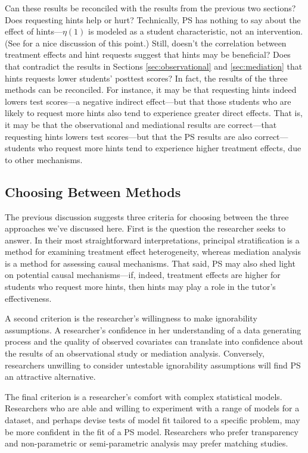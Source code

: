 \documentclass{article}\usepackage[]{graphicx}\usepackage[]{color}
\begin{document}
Can these results be reconciled with the results from the previous two
sections?
Does requesting hints help or hurt?
Technically, PS has nothing to say about the effect of hints---$\eta(1)$
is modeled as a student characteristic, not an intervention.
(See \citealt{jin2008principal} for a nice discussion of this point.)
Still, doesn't the correlation between treatment effects and hint
requests suggest that hints may be beneficial?
Does that contradict the results in Sections \ref{sec:observational}
and \ref{sec:mediation} that hints requests lower students' posttest
scores?
In fact, the results of the three methods can be reconciled.
For instance, it may be that requesting hints indeed lowers test
scores---a negative indirect effect---but that those students who are
likely to request more hints also tend to experience greater direct
effects.
That is, it may be that the observational and mediational results are
correct---that requesting hints lowers test scores---but that the PS
results are also correct---students who request more hints tend to
experience higher treatment effects, due to other mechanisms.

\subsection{Choosing Between Methods}

The previous discussion suggests three criteria for choosing between
the three approaches we've discussed here.
First is the question the researcher seeks to answer.
In their most straightforward interpretations, principal stratification
is a method for examining treatment effect heterogeneity, whereas
mediation analysis is a method for assessing causal mechanisms.
That said, PS may also shed light on potential causal mechanisms---if,
indeed, treatment effects are higher for students who request more
hints, then hints may play a role in the tutor's effectiveness.

A second criterion is the researcher's willingness to make
ignorability assumptions.
A researcher's confidence in her understanding of a data generating
process and the quality of observed covariates can translate into
confidence about the results of an observational study or mediation
analysis.
Conversely, researchers unwilling to consider untestable ignorability
assumptions will find PS an attractive alternative.

The final criterion is a researcher's comfort with complex statistical
models.
Researchers who are able and willing to experiment with a range of
models for a dataset, and perhaps devise tests of model fit tailored
to a specific problem, may be more confident in the fit of a PS model.
Researchers who prefer transparency and non-parametric or
semi-parametric analysis may prefer matching studies.
\end{document}
